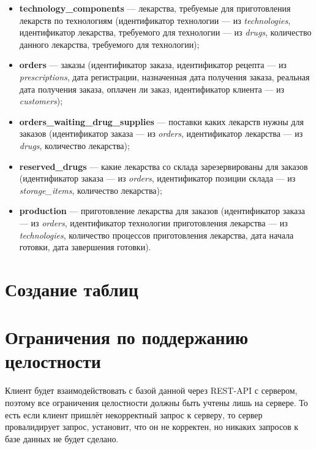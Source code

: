 \documentclass[a4paper]{article}
\newcommand{\dbtable}[1]{\textbf{#1}}
\newcommand{\dbtableref}[1]{\textit{#1}}
\begin{document}
\begin{itemize}
				\item \dbtable{technology\_components} --- лекарства, требуемые для приготовления лекарств по технологиям (идентификатор технологии --- из \dbtableref{technologies}, идентификатор лекарства, требуемого для технологии --- из \dbtableref{drugs}, количество данного лекарства, требуемого для технологии);
				
				\item \dbtable{orders} --- заказы (идентификатор заказа, идентификатор рецепта --- из \dbtableref{prescriptions}, дата регистрации, назначенная дата получения заказа, реальная дата получения заказа, оплачен ли заказ, идентификатор клиента --- из \dbtableref{customers});
				
				\item \dbtable{orders\_waiting\_drug\_supplies} --- поставки каких лекарств нужны для заказов (идентификатор заказа --- из \dbtableref{orders}, идентификатор лекарства --- из \dbtableref{drugs}, количество лекарства);
				
				\item \dbtable{reserved\_drugs} --- какие лекарства со склада зарезервированы для заказов (идентификатор заказа --- из \dbtableref{orders}, идентификатор позиции склада --- из \dbtableref{storage\_items}, количество лекарства);
				
				\item \dbtable{production} --- приготовление лекарства для заказов (идентификатор заказа --- из \dbtableref{orders}, идентификатор технологии приготовления лекарства --- из \dbtableref{technologies}, количество процессов приготовления лекарства, дата начала готовки, дата завершения готовки).
			\end{itemize}	
	\newpage
	\section{Создание таблиц}
		
	\newpage
	\section{Ограничения по поддержанию целостности}
		Клиент будет взаимодействовать с базой данной через REST-API с сервером, поэтому все ограничения целостности должны быть учтены лишь на сервере. То есть если клиент пришлёт некорректный запрос к серверу, то сервер провалидирует запрос, установит, что он не корректен, но никаких запросов к базе данных не будет сделано.
\end{document}

